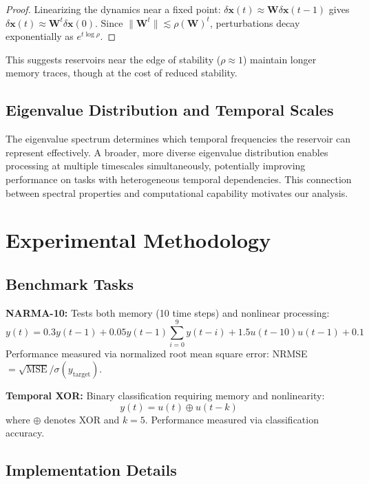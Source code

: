 \documentclass{article}
\begin{document}
\begin{proof}
Linearizing the dynamics near a fixed point: $\delta\mathbf{x}(t) \approx \mathbf{W}\delta\mathbf{x}(t-1)$ gives $\delta\mathbf{x}(t) \approx \mathbf{W}^t\delta\mathbf{x}(0)$. Since $\|\mathbf{W}^t\| \lesssim \rho(\mathbf{W})^t$, perturbations decay exponentially as $e^{t\log\rho}$.
\end{proof}

This suggests reservoirs near the edge of stability ($\rho \approx 1$) maintain longer memory traces, though at the cost of reduced stability.

\subsection{Eigenvalue Distribution and Temporal Scales}

The eigenvalue spectrum determines which temporal frequencies the reservoir can represent effectively. A broader, more diverse eigenvalue distribution enables processing at multiple timescales simultaneously, potentially improving performance on tasks with heterogeneous temporal dependencies. This connection between spectral properties and computational capability motivates our analysis.

\section{Experimental Methodology}

\subsection{Benchmark Tasks}

\textbf{NARMA-10:} Tests both memory (10 time steps) and nonlinear processing:
\begin{equation}
y(t) = 0.3y(t-1) + 0.05y(t-1)\sum_{i=0}^{9}y(t-i) + 1.5u(t-10)u(t-1) + 0.1
\end{equation}
Performance measured via normalized root mean square error: NRMSE $= \sqrt{\text{MSE}}/\sigma(y_{\text{target}})$.

\textbf{Temporal XOR:} Binary classification requiring memory and nonlinearity:
\begin{equation}
y(t) = u(t) \oplus u(t-k)
\end{equation}
where $\oplus$ denotes XOR and $k=5$. Performance measured via classification accuracy.

\subsection{Implementation Details}
\end{document}
